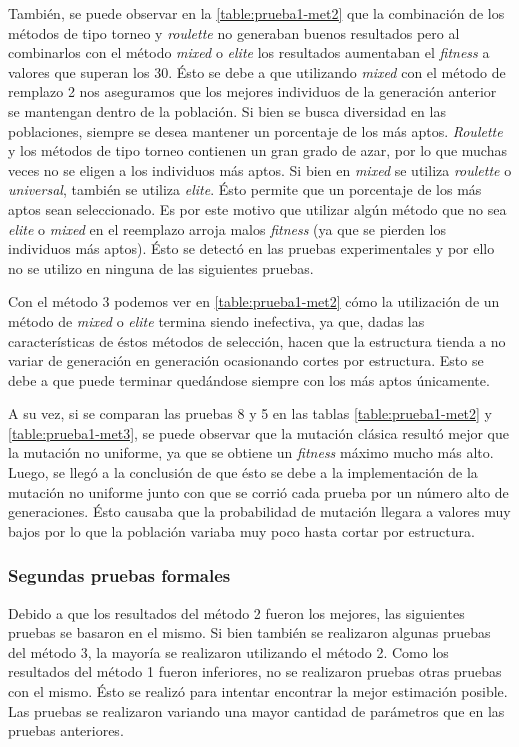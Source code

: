 \documentclass[11pt,a4paper]{article}
\begin{document}
También, se puede observar en la \ref{table:prueba1-met2} que la combinación de los métodos de tipo torneo y \emph{roulette} no generaban buenos resultados pero al combinarlos con el método \emph{mixed} o \emph{elite} los resultados aumentaban el \emph{fitness} a valores que superan los $30$. Ésto se debe a que utilizando \emph{mixed} con el método de remplazo 2 nos aseguramos que los mejores individuos de la generación anterior se mantengan dentro de la población. Si bien se busca diversidad en las poblaciones, siempre se desea mantener un porcentaje de los más aptos. \emph{Roulette} y los métodos de tipo torneo contienen un gran grado de azar, por lo que muchas veces no se eligen a los individuos más aptos. Si bien en \emph{mixed} se utiliza \emph{roulette} o \emph{universal}, también se utiliza \emph{elite}. Ésto permite que un porcentaje de los más aptos sean seleccionado. Es por este motivo que utilizar algún método que no sea \emph{elite} o \emph{mixed} en el reemplazo arroja malos \emph{fitness} (ya que se pierden los individuos más aptos). Ésto se detectó en las pruebas experimentales y por ello no se utilizo en ninguna de las siguientes pruebas.

Con el método $3$ podemos ver en \ref{table:prueba1-met2} cómo la utilización de un método de \emph{mixed} o \emph{elite} termina siendo inefectiva, ya que, dadas las características de éstos métodos de selección, hacen que la estructura tienda a no variar de generación en generación ocasionando cortes por estructura. Esto se debe a que puede terminar quedándose siempre con los más aptos únicamente. 

A su vez, si se comparan las pruebas 8 y 5 en las tablas \ref{table:prueba1-met2} y \ref{table:prueba1-met3}, se puede observar que la mutación clásica resultó mejor que la mutación no uniforme, ya que se obtiene un \emph{fitness} máximo mucho más alto. Luego, se llegó a la conclusión de que ésto se debe a la implementación de la mutación no uniforme junto con que se corrió cada prueba por un número alto de generaciones. Ésto causaba que la probabilidad de mutación llegara a valores muy bajos por lo que la población variaba muy poco hasta cortar por estructura.

\subsubsection{Segundas pruebas formales}

Debido a que los resultados del método 2 fueron los mejores, las siguientes pruebas se basaron en el mismo. Si bien también se realizaron algunas pruebas del método 3, la mayoría se realizaron utilizando el método 2. Como los resultados del método 1 fueron inferiores, no se realizaron pruebas otras pruebas con el mismo. Ésto se realizó para intentar encontrar la mejor estimación posible. Las pruebas se realizaron variando una mayor cantidad de parámetros que en las pruebas anteriores.
\end{document}

